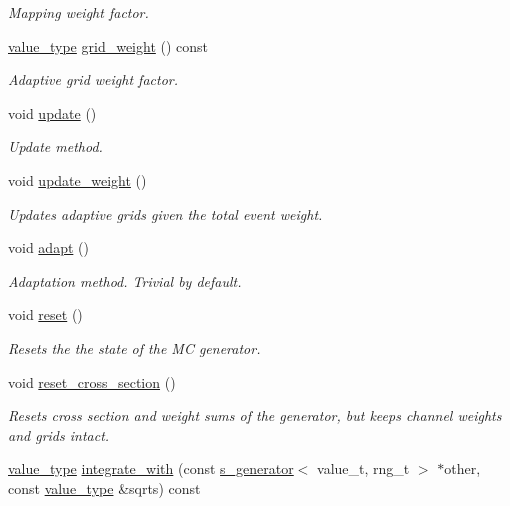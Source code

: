 \begin{DoxyCompactItemize}
\begin{DoxyCompactList}\small\item\em Mapping weight factor. \end{DoxyCompactList}\item 
\hypertarget{a00001_aef58f02dd2a50d1d63da6a3f6bb84c2c}{\hyperlink{a00362_a3353150105036deac9bde097cbf1d8af}{value\-\_\-type} \hyperlink{a00001_aef58f02dd2a50d1d63da6a3f6bb84c2c}{grid\-\_\-weight} () const }\label{a00001_aef58f02dd2a50d1d63da6a3f6bb84c2c}

\begin{DoxyCompactList}\small\item\em Adaptive grid weight factor. \end{DoxyCompactList}\item 
void \hyperlink{a00001_aaf21d07ea43dcc7556ba3fc1c6703160}{update} ()
\begin{DoxyCompactList}\small\item\em Update method. \end{DoxyCompactList}\item 
\hypertarget{a00001_af2ce45f4b873b79942d479ed49787103}{void \hyperlink{a00001_af2ce45f4b873b79942d479ed49787103}{update\-\_\-weight} ()}\label{a00001_af2ce45f4b873b79942d479ed49787103}

\begin{DoxyCompactList}\small\item\em Updates adaptive grids given the total event weight. \end{DoxyCompactList}\item 
\hypertarget{a00001_aad3d86a84f3fc66657500fa5bfeaf4c7}{void \hyperlink{a00001_aad3d86a84f3fc66657500fa5bfeaf4c7}{adapt} ()}\label{a00001_aad3d86a84f3fc66657500fa5bfeaf4c7}

\begin{DoxyCompactList}\small\item\em Adaptation method. Trivial by default. \end{DoxyCompactList}\item 
void \hyperlink{a00001_a8083f3252ded95b8f48e0d5746b34a40}{reset} ()
\begin{DoxyCompactList}\small\item\em Resets the the state of the M\-C generator. \end{DoxyCompactList}\item 
void \hyperlink{a00001_a58424d0ff97bded5d1f43f9314122570}{reset\-\_\-cross\-\_\-section} ()
\begin{DoxyCompactList}\small\item\em Resets cross section and weight sums of the generator, but keeps channel weights and grids intact. \end{DoxyCompactList}\item 
\hypertarget{a00001_abbfd2f35259aae8afd97c9da8131a602}{\hyperlink{a00362_a3353150105036deac9bde097cbf1d8af}{value\-\_\-type} \hyperlink{a00001_abbfd2f35259aae8afd97c9da8131a602}{integrate\-\_\-with} (const \hyperlink{a00482}{s\-\_\-generator}$<$ value\-\_\-t, rng\-\_\-t $>$ $\ast$other, const \hyperlink{a00362_a3353150105036deac9bde097cbf1d8af}{value\-\_\-type} \&sqrts) const }\label{a00001_abbfd2f35259aae8afd97c9da8131a602}


\end{DoxyCompactItemize}
